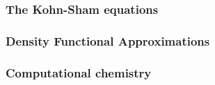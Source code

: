 \documentclass[mathserif, 10pt]{beamer}
\begin{document}
\begin{frame}
    \frametitle{The Kohn-Sham equations}
\end{frame}

\begin{frame}
    \frametitle{Density Functional Approximations}
\end{frame}

\begin{frame}
    \frametitle{Computational chemistry}
    \begin{center}

\end{center}
\end{frame}
\end{document}
